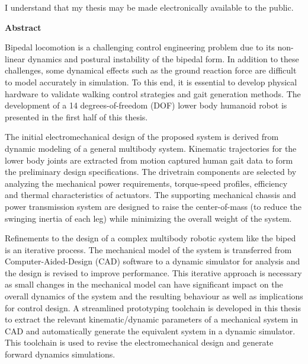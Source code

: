 \bigskip
  
\noindent
I understand that my thesis may be made electronically available to the public.

\cleardoublepage


\begin{center}
    \textbf{Abstract}
\end{center}

Bipedal locomotion is a challenging control engineering problem due to its non-linear dynamics and postural instability of the bipedal form. In addition to these challenges, some dynamical effects such as the ground reaction force are difficult to model accurately in simulation. To this end, it is essential to develop physical hardware to validate walking control strategies and gait generation methods. The development of a 14 degrees-of-freedom (DOF) lower body humanoid robot is presented in the first half of this thesis. 

The initial electromechanical design of the proposed system is derived from dynamic modeling of a general multibody system. Kinematic trajectories for the lower body joints are extracted from motion captured human gait data to form the preliminary design specifications. The drivetrain components are selected by analyzing the mechanical power requirements, torque-speed profiles, efficiency and thermal characteristics of actuators. The supporting mechanical chassis and power transmission system are designed to raise the center-of-mass (to reduce the swinging inertia of each leg) while minimizing the overall weight of the system. 

Refinements to the design of a complex multibody robotic system like the biped is an iterative process. The mechanical model of the system is transferred from Computer-Aided-Design (CAD) software to a dynamic simulator for analysis and the design is revised to improve performance. This iterative approach is necessary as small changes in the mechanical model can have significant impact on the overall dynamics of the system and the resulting behaviour as well as implications for control design. A streamlined prototyping toolchain is developed in this thesis to extract the relevant kinematic/dynamic parameters of a mechanical system in CAD and automatically generate the equivalent system in a dynamic simulator. This toolchain is used to revise the electromechanical design and generate forward dynamics simulations. 

